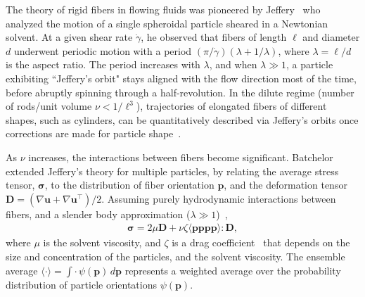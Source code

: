 \documentclass[preprint, 10pt]{elsarticle}
\begin{document}
The theory of rigid fibers in flowing fluids was pioneered by
Jeffery~\cite{Jeffery1922} who analyzed the motion of a single
spheroidal particle sheared in a Newtonian solvent. At a given shear
rate $\dot{\gamma}$, he observed that fibers of length $\ell$ and
diameter $d$ underwent periodic motion with a period $(\pi/\dot{\gamma})
(\lambda + 1/\lambda)$, where $\lambda = \ell/d$ is the aspect ratio.
The period increases with $\lambda$, and when $\lambda \gg 1$, a
particle exhibiting ``Jeffery's orbit" stays aligned with the flow
direction most of the time, before abruptly spinning through a
half-revolution. In the dilute regime (number of rods/unit volume $\nu <
1/\ell^3$), trajectories of elongated fibers of different shapes, such
as cylinders, can be quantitatively described via Jeffery's orbits once
corrections are made for particle shape~\cite{Bretherton1962}.

As $\nu$ increases, the interactions between fibers become significant.
Batchelor extended Jeffery's theory for multiple particles, by relating
the average stress tensor, ${\bm \sigma}$, to the distribution of fiber
orientation $\mathbf{p}$, and the deformation tensor $\mathbf{D} =
(\nabla \mathbf{u} + \nabla \mathbf{u}^\intercal)/2$. Assuming purely
hydrodynamic interactions between fibers, and a slender body
approximation ($\lambda \gg 1$)~\cite{Batchelor1970, Batchelor1970a,
Doi1978, Dinh1984, Shaqfeh1990},
\begin{align}
  {\bm \sigma} = 2 \mu \mathbf{D} + \nu \zeta 
    \langle \mathbf{p p p p} \rangle : \mathbf{D},
\label{eqn:batchelor}
\end{align}
where $\mu$ is the solvent viscosity, and $\zeta$ is a drag
coefficient~\cite{Batchelor1971} that depends on the size and
concentration of the particles, and the solvent viscosity. The ensemble
average $\langle \cdot \rangle = \int \cdot \,
\psi(\mathbf{p})\,d\mathbf{p}$ represents a weighted average over the
probability distribution of particle orientations $\psi(\mathbf{p})$. 
\end{document}
